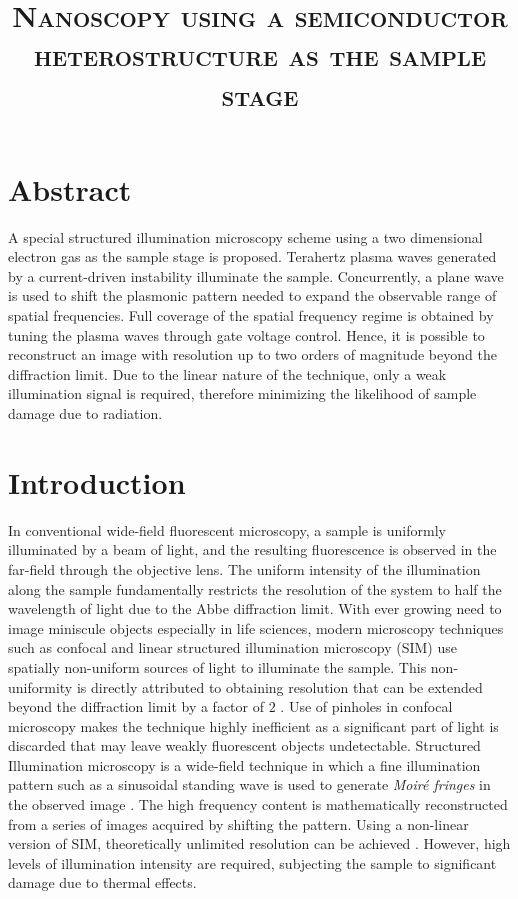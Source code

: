 \documentclass[12pt]{article}
\begin{document}
\title{\textsc{Nanoscopy using a semiconductor heterostructure as the sample stage}}

\maketitle


\section{Abstract}
%
A special structured illumination microscopy scheme using a two dimensional electron gas as the sample stage is proposed. Terahertz plasma waves generated by a current-driven instability illuminate the sample. Concurrently, a plane wave is used to shift the plasmonic pattern needed to expand the observable range of spatial frequencies. Full coverage of the spatial frequency regime is obtained by tuning the plasma waves through gate voltage control. Hence, it is possible to reconstruct an image with resolution up to two orders of magnitude beyond the diffraction limit. Due to the linear nature of the technique, only a weak illumination signal is required, therefore minimizing the likelihood of sample damage due to radiation.
%
\section{Introduction}
%
In conventional wide-field fluorescent microscopy, a sample is uniformly illuminated by a beam of light, and the resulting fluorescence is observed in the far-field through the objective lens. The uniform intensity of the illumination along the sample fundamentally restricts the resolution of the system to half the wavelength of light due to the Abbe diffraction limit. With ever growing need to image miniscule objects especially in life sciences, modern microscopy techniques such as confocal and linear structured illumination microscopy (SIM) use spatially non-uniform sources of light to illuminate the sample. This non-uniformity is directly attributed to obtaining resolution that can be extended beyond the diffraction limit by a factor of $2$ \cite{Minsky1988,Gustafsson2000}. Use of pinholes in confocal microscopy makes the technique highly inefficient as a significant part of light is discarded that may leave weakly fluorescent objects undetectable. Structured Illumination microscopy is a wide-field technique in which a fine illumination pattern such as a sinusoidal standing wave is used to generate \emph{Moiré fringes} in the
observed image \cite{Heintzmann1999, Heintzmann2006}. The high frequency content is mathematically reconstructed from a series of images acquired by shifting the pattern. Using a non-linear version of SIM, theoretically unlimited resolution can be achieved \cite{Gustafsson_2005}. However, high levels of illumination intensity are required, subjecting the sample to significant damage due to thermal effects.
\end{document}
